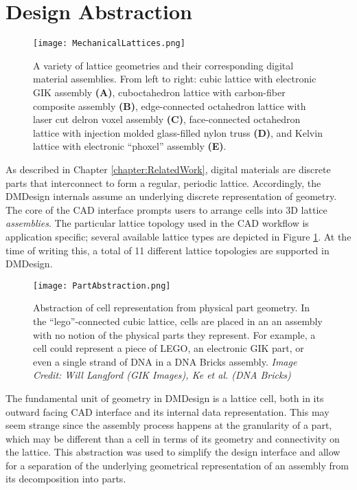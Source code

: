 {\section{Design Abstraction}

\begin{figure}
  \texttt{[image: MechanicalLattices.png]}
  \caption{A variety of lattice geometries and their corresponding digital material assemblies.  From left to right: cubic lattice with electronic GIK assembly \textbf{(A)}, cuboctahedron lattice with carbon-fiber composite assembly \textbf{(B)}, edge-connected octahedron lattice with laser cut delron voxel assembly \textbf{(C)}, face-connected octahedron lattice with injection molded glass-filled nylon truss \textbf{(D)}, and Kelvin lattice with electronic ``phoxel'' assembly \textbf{(E)}.}
  \label{fig:MechanicalLattices}
\end{figure}

As described in Chapter \ref{chapter:RelatedWork}, digital materials are discrete parts that interconnect to form a regular, periodic lattice.  Accordingly, the DMDesign internals assume an underlying discrete representation of geometry.  The core of the CAD interface prompts users to arrange cells into 3D lattice \textit{assemblies}.  The particular lattice topology used in the CAD workflow is application specific; several available lattice types are depicted in Figure \ref{fig:MechanicalLattices}.  At the time of writing this, a total of 11 different lattice topologies are supported in DMDesign.\\

\begin{figure}
  \texttt{[image: PartAbstraction.png]}
  \caption{Abstraction of cell representation from physical part geometry.  In the ``lego''-connected cubic lattice, cells are placed in an an assembly with no notion of the physical parts they represent.  For example, a cell could represent a piece of LEGO, an electronic GIK part, or even a single strand of DNA in a DNA Bricks assembly.  \textit{Image Credit: Will Langford (GIK Images), Ke et al. (DNA Bricks)} \cite{Ke2012}}
  \label{fig:PartAbstraction}
\end{figure}

The fundamental unit of geometry in DMDesign is a lattice cell, both in its outward facing CAD interface and its internal data representation.  This may seem strange since the assembly process happens at the granularity of a part, which may be different than a cell in terms of its geometry and connectivity on the lattice.  This abstraction was used to simplify the design interface and allow for a separation of the underlying geometrical representation of an assembly from its decomposition into parts.\\

}
